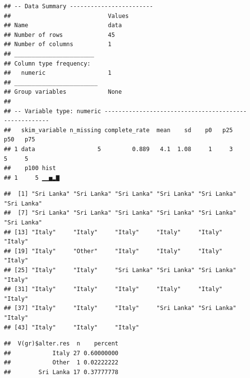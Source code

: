 \documentclass[
]{book}
\newenvironment{Shaded}{\begin{snugshade}}{\end{snugshade}}
\newcommand{\CommentTok}[1]{\textcolor[rgb]{0.56,0.35,0.01}{\textit{#1}}}
\newcommand{\FunctionTok}[1]{\textcolor[rgb]{0.00,0.00,0.00}{#1}}
\newcommand{\NormalTok}[1]{#1}
\newcommand{\SpecialCharTok}[1]{\textcolor[rgb]{0.00,0.00,0.00}{#1}}
\begin{document}
\begin{verbatim}
## -- Data Summary ------------------------
##                            Values
## Name                       data  
## Number of rows             45    
## Number of columns          1     
## _______________________          
## Column type frequency:           
##   numeric                  1     
## ________________________         
## Group variables            None  
## 
## -- Variable type: numeric ------------------------------------------------------
##   skim_variable n_missing complete_rate  mean    sd    p0   p25   p50   p75
## 1 data                  5         0.889   4.1  1.08     1     3     5     5
##    p100 hist 
## 1     5 ▁▁▅▂▇
\end{verbatim}

\begin{Shaded}
\end{Shaded}

\begin{verbatim}
##  [1] "Sri Lanka" "Sri Lanka" "Sri Lanka" "Sri Lanka" "Sri Lanka" "Sri Lanka"
##  [7] "Sri Lanka" "Sri Lanka" "Sri Lanka" "Sri Lanka" "Sri Lanka" "Sri Lanka"
## [13] "Italy"     "Italy"     "Italy"     "Italy"     "Italy"     "Italy"    
## [19] "Italy"     "Other"     "Italy"     "Italy"     "Italy"     "Italy"    
## [25] "Italy"     "Italy"     "Sri Lanka" "Sri Lanka" "Sri Lanka" "Italy"    
## [31] "Italy"     "Italy"     "Italy"     "Italy"     "Italy"     "Italy"    
## [37] "Italy"     "Italy"     "Italy"     "Sri Lanka" "Sri Lanka" "Italy"    
## [43] "Italy"     "Italy"     "Italy"
\end{verbatim}

\begin{Shaded}
\end{Shaded}

\begin{verbatim}
##  V(gr)$alter.res  n    percent
##            Italy 27 0.60000000
##            Other  1 0.02222222
##        Sri Lanka 17 0.37777778
\end{verbatim}
\end{document}
